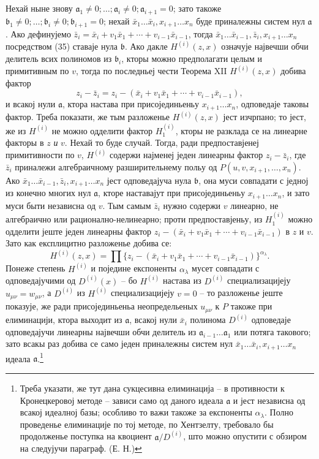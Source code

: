 \documentclass[11pt]{article}
\providecommand{\aideal}{\mathfrak a}
\providecommand{\bideal}{\mathfrak b}
\begin{document}
Нехай ныне знову $\aideal_1\ne0;\ldots;\aideal_i\ne0;\aideal_{i+1}=0$; зато такоже $\bideal_1\ne0;\ldots;\bideal_i\ne0;\bideal_{i+1}=0$; нехай $\bar x_1\ldots\bar x_i,x_{i+1}\ldots x_n$ буде приналежны систем нул $\aideal$. Ако дефинујемо $\bar z_i=\bar x_i+v_1\bar x_1+\cdots+v_{i-1}\bar x_{i-1}$, тогда $\bar x_1\ldots\bar x_{i-1},\bar z_i,x_{i+1}\ldots x_n$ посредством (35) ставаје нула $\bideal$. Ако дакле $H^{(i)}(z,x)$ означује највечши обчи делитель всих полиномов из $\bideal_i$, кторы можно предполагати целым и примитивным по $v$, тогда по последньеј чести Теорема XII $H^{(i)}(z,x)$ добива фактор
\[
 z_i-\bar z_i=z_i-(\bar x_i+v_1\bar x_1+\cdots+v_{i-1}\bar x_{i-1}),
\]
и всакој нули $\aideal$, ктора настава при присојединьеньу $x_{i+1}\ldots x_n$, одповедаје таковы фактор. Треба показати, же тым разложенье $H^{(i)}(z,x)$ јест изчрпано; то јест, же из $H^{(i)}$ не можно одделити фактор $H^{(i)}_1$, кторы не разклада се на линеарне факторы в $z$ \emph{и} $v$. Нехай то буде случай. Тогда, ради предпоставјенеј примитивности по $v$, $H^{(i)}$ содержи најменеј једен линеарны фактор $z_i-\bar z_i$, где $\bar z_i$ приналежи алгебраичному разширительнему польу од $P(u,v,x_{i+1},\ldots,x_n)$. Ако $\bar x_1\ldots\bar x_{i-1},\bar z_i,x_{i+1}\ldots x_n$ јест одповедајуча нула $\bideal$, она муси совпадати с једној из конечно многих нул $\aideal$, кторе наставајут при присојединьеньу $x_{i+1}\ldots x_n$, и зато муси быти независна од $v$. Тым самым $\bar z_i$ нужно содержи $v$ линеарно, не алгебраично или рационално-нелинеарно; проти предпоставјеньу, из $H^{(i)}_1$ можно одделити јеште једен линеарны фактор $z_i-(\bar x_i+v_1\bar x_1+\cdots+v_{i-1}\bar x_{i-1})$ в $z$ и $v$. Зато как експлицитно разложенье добива се:
\[
 H^{(i)}(z,x)=\prod \{z_i-(\bar x_i+v_1\bar x_1+\cdots+v_{i-1}\bar x_{i-1})\}^{\alpha_\lambda}.
\]
Понеже степень $H^{(i)}$ и поједине експоненты $\alpha_\lambda$ мусет совпадати с одповедајучими од $D^{(i)}(x)$ -- бо $H^{(i)}$ настава из $D^{(i)}$ специализацијеју $u_{\mu\nu}=w_{\mu\nu}$, а $D^{(i)}$ из $H^{(i)}$ специализацијеју $v=0$ -- то разложенье јеште показује, же ради присојединьеньа неопредельеных $u_{\mu\nu}$ к $P$ такоже при елиминацији, ктора выходит из $\aideal$, всакој нули $\bar x_i$ полинома $D^{(i)}$ одповедаје одповедајучи линеарны највечши обчи делитель из $\aideal_{i-1}\ldots\aideal_1$ или потяга такового; зато всакы раз добива се само једен приналежны систем нул $\bar x_1\ldots\bar x_i,x_{i+1}\ldots x_n$ идеала $\aideal$.\footnote{Треба указати, же тут дана сукцесивна елиминација -- в противности к Кронецкеровој методе -- зависи само од даного идеала $\aideal$ и јест независна од всакој идеалној базы; особливо то важи такоже за експоненты $\alpha_\lambda$. Полно проведенье елиминације по тој методе, по Хентзелту, требовало бы продолженье поступка на квоциент $\aideal/D^{(i)}$, што можно опустити с обзиром на следујучи параграф. (Е. Н.)}
\end{document}
